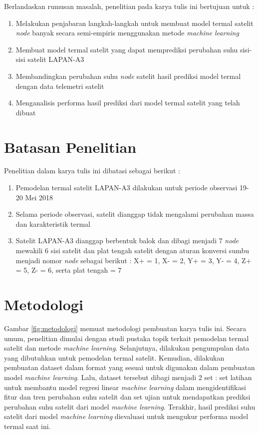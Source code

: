 Berlandaskan rumusan masalah, penelitian pada karya tulis ini bertujuan untuk :

\begin{enumerate}
\item Melakukan penjabaran langkah-langkah untuk membuat model termal satelit \textit{node} banyak secara semi-empiris menggunakan metode \textit{machine learning}
\item Membuat model termal satelit yang dapat memprediksi perubahan suhu sisi-sisi satelit LAPAN-A3
\item Membandingkan perubahan suhu \textit{node} satelit hasil prediksi model termal dengan data telemetri satelit
\item Menganalisis performa hasil prediksi dari model termal satelit yang telah dibuat
\end{enumerate}

\section{Batasan Penelitian}

Penelitian dalam karya tulis ini dibatasi sebagai berikut :

\begin{enumerate}
\item Pemodelan termal satelit LAPAN-A3 dilakukan untuk periode observasi 19-20 Mei 2018
\item Selama periode observasi, satelit dianggap tidak mengalami perubahan massa dan karakteristik termal
\item Satelit LAPAN-A3 dianggap berbentuk balok dan dibagi menjadi 7
	\textit{node} mewakili 6 sisi satelit dan plat tengah satelit dengan aturan
		konversi sumbu menjadi nomor \textit{node} sebagai berikut : X+ = 1, X- =
		2, Y+ = 3, Y- = 4, Z+ = 5, Z- = 6, serta plat tengah = 7
\end{enumerate}

\section{Metodologi}

Gambar \ref{fig:metodologi} memuat metodologi pembuatan karya tulis ini. Secara
umum, penelitian dimulai dengan studi pustaka topik terkait pemodelan termal
satelit dan metode \textit{machine learning}. Selanjutnya, dilakukan
pengumpulan data yang dibutuhkan untuk pemodelan termal satelit. Kemudian,
dilakukan pembuatan dataset dalam format yang sesuai untuk digunakan dalam
pembuatan model \textit{machine learning}. Lalu, dataset tersebut dibagi
menjadi 2 set : set latihan untuk membantu model regresi linear \textit{machine
learning} dalam mengidentifikasi fitur dan tren perubahan suhu satelit dan set
ujian untuk mendapatkan prediksi perubahan suhu satelit dari model
\textit{machine learning}. Terakhir, hasil prediksi suhu satelit dari model
\textit{machine learning} dievaluasi untuk mengukur performa model termal saat ini.

